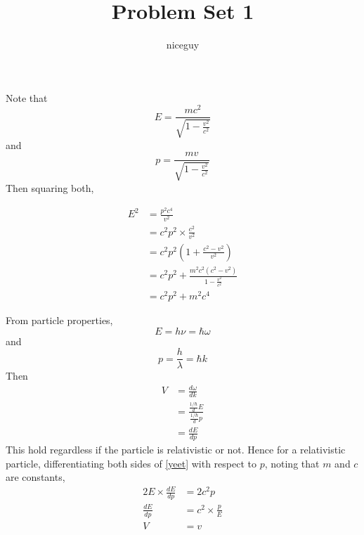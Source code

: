 \documentclass[answers]{exam}
\author{niceguy}
\title{Problem Set 1}
\begin{document}
\maketitle

\begin{questions}


\begin{solution}
    Note that
    \begin{equation}
        E = \frac{mc^2}{\sqrt{1 - \frac{v^2}{c^2}}}
    \end{equation}
    and
    \begin{equation}
        p = \frac{mv}{\sqrt{1 - \frac{v^2}{c^2}}}
    \end{equation}
    Then squaring both,

    \begin{align}\label{yeet}
        E^2 &= \frac{p^2c^4}{v^2} \\
            &= c^2p^2 \times \frac{c^2}{v^2} \\
            &= c^2p^2 \left(1 + \frac{c^2-v^2}{v^2}\right) \\
            &= c^2p^2 + \frac{m^2c^2(c^2-v^2)}{1 - \frac{v^2}{c^2}} \\
            &= c^2p^2 + m^2c^4
    \end{align}

    From particle properties,
    $$E = h\nu = \hbar \omega$$
    and
    $$p = \frac{h}{\lambda} = \hbar k$$
    Then
    \begin{align*}
        V &= \frac{d\omega}{dk} \\
          &= \frac{\frac{1/\hbar}dE}{\frac{1/\hbar}dp} \\
          &= \frac{dE}{dp}
    \end{align*}
    This hold regardless if the particle is relativistic or not. Hence for a relativistic particle, differentiating both sides of \ref{yeet} with respect to $p$, noting that $m$ and $c$ are constants,
    \begin{align*}
        2E \times \frac{dE}{dp} &= 2c^2p \\
        \frac{dE}{dp} &= c^2 \times \frac{p}{E} \\
        V &= v
    \end{align*}
\end{solution}



\end{questions}
\end{document}
